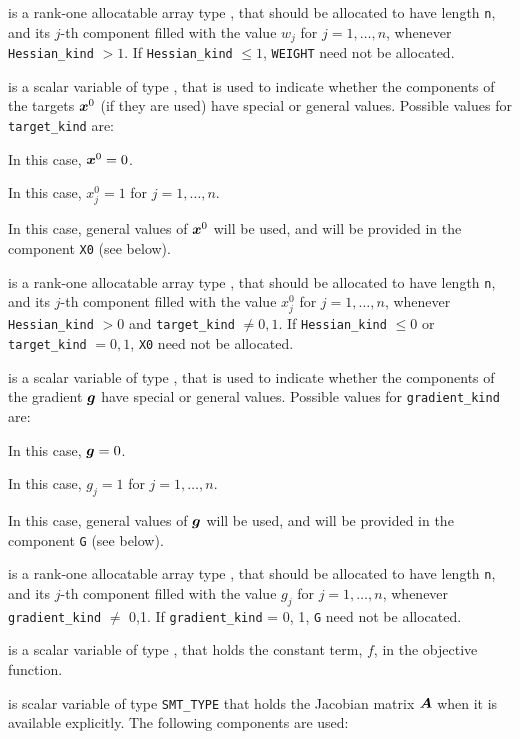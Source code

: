 \documentclass{galahad}
\begin{document}
\begin{description}
 is a rank-one allocatable array type \realdp, that
should be allocated to have length {\tt n}, and its $j$-th component
filled with the value $w_{j}$ for $j = 1, \ldots , n$,
whenever {\tt Hessian\_kind} $>1$.
If {\tt Hessian\_kind} $\leq 1$, {\tt WEIGHT} need not be allocated.

 is a scalar variable of type \integer,
that is used to indicate whether the components of the targets ${\bm{x}}^0$
(if they are used) have special or general values. Possible values for
{\tt target\_kind} are:
\begin{description}
  In this case, ${\bm{x}}^0 = 0$.

 In this case, $x^0_{j} = 1$ for $j = 1, \ldots , n$.

 In this case, general values of ${\bm{x}}^0$ will be used,
     and will be provided in the component {\tt X0} (see below).
\end{description}

 is a rank-one allocatable array type \realdp, that
should be allocated to have length {\tt n}, and its $j$-th component
filled with the value $x_{j}^0$ for $j = 1, \ldots , n$,
whenever {\tt Hessian\_kind} $>0$ and {\tt target\_kind} $\neq 0,1$.
If {\tt Hessian\_kind} $\leq 0$ or {\tt target\_kind} $= 0,1$,
{\tt X0} need not be allocated.

 is a scalar variable of type \integer,
that is used to indicate whether the components of the gradient ${\bm{g}}$
have special or general values. Possible values for {\tt gradient\_kind} are:
\begin{description}
  In this case, ${\bm{g}} = 0$.

 In this case, $g_{j} = 1$ for $j = 1, \ldots , n$.

 In this case, general values of ${\bm{g}}$ will be used,
     and will be provided in the component {\tt G} (see below).
\end{description}

 is a rank-one allocatable array type \realdp, that
should be allocated to have length {\tt n}, and its $j$-th component
filled with the value $g_{j}$ for $j = 1, \ldots , n$,
whenever {\tt gradient\_kind} $\neq$ 0,1.
If {\tt gradient\_kind} {= 0, 1}, {\tt G} need not be allocated.

 is a scalar variable of type
\realdp, that holds
the constant term, $f$, in the objective function.

 is scalar variable of type {\tt SMT\_TYPE}
that holds the Jacobian matrix ${\bm{A}}$ when it is available explicitly.
The following components are used:


\end{description}
\end{document}
